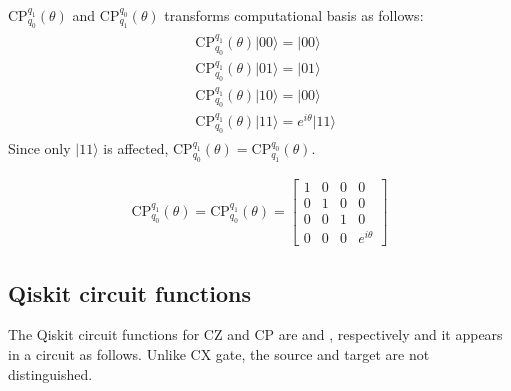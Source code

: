\documentclass[letterpaper,10pt,english]{jupyterBook}
\begin{document}
\sphinxAtStartPar
CP\(_{q_0}^{q_1}(\theta)\) and CP\(_{q_1}^{q_0}(\theta)\) transforms computational basis as follows:
\begin{equation*}
\begin{split}
\begin{align}
&\text{CP}_{q_0}^{q_1}(\theta) \lvert 00\rangle = \lvert 00\rangle\\
&\text{CP}_{q_0}^{q_1}(\theta) \lvert 01\rangle = \lvert 01\rangle\\
&\text{CP}_{q_0}^{q_1}(\theta) \lvert 10\rangle = \lvert 00\rangle\\
&\text{CP}_{q_0}^{q_1}(\theta) \lvert 11\rangle = e^{i \theta}\lvert 11\rangle
\end{align}
\end{split}
\end{equation*}
\sphinxAtStartPar
Since only \(\lvert 11\rangle\) is affected, \(\text{CP}_{q_0}^{q_1}(\theta)= \text{CP}_{q_1}^{q_0}(\theta)\).

\sphinxAtStartPar
{}
\begin{equation*}
\begin{split}
\text{CP}_{q_0}^{q_1}(\theta) = \text{CP}_{q_0}^{q_1}(\theta)  = \begin{bmatrix} 1&0&0&0\\0&1&0&0\\0&0&1&0\\0&0&0&e^{i\theta}\end{bmatrix}
\end{split}
\end{equation*}

\subsection{Qiskit circuit functions}
\label{\detokenize{q2gates/cp:qiskit-circuit-functions}}
\sphinxAtStartPar
The Qiskit circuit functions for CZ and CP are  and , respectively and it appears in a circuit as follows.  Unlike CX gate, the source and target are not distinguished.
\end{document}

